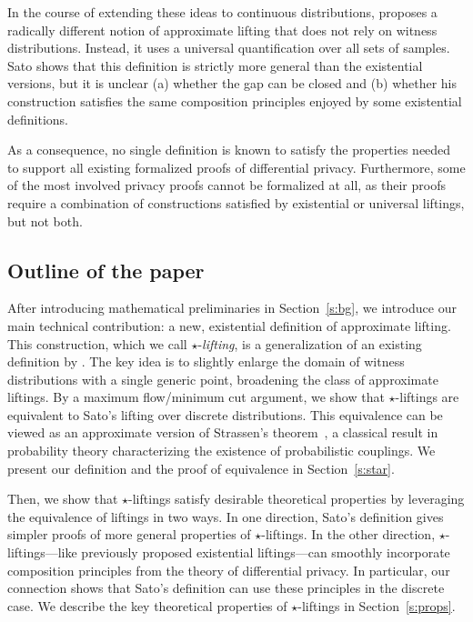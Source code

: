 \documentclass{lmcs}
\begin{document}
In the course of extending these ideas to continuous distributions,
\citet{Sato16} proposes a radically different notion of approximate lifting that
does not rely on witness distributions. Instead, it uses a universal
quantification over all sets of samples. Sato shows that this definition is
strictly more general than the existential versions, but it is unclear (a)
whether the gap can be closed and (b) whether his construction satisfies the
same composition principles enjoyed by some existential definitions.

As a consequence, no single definition is known to satisfy the properties needed
to support all existing formalized proofs of differential privacy. Furthermore,
some of the most involved privacy proofs cannot be formalized at all, as their
proofs require a combination of constructions satisfied by existential or
universal liftings, but not both.

\subsection*{Outline of the paper}

After introducing mathematical preliminaries in Section~\ref{s:bg}, we introduce
our main technical contribution: a new, existential definition of approximate
lifting. This construction, which we call $\star$-\emph{lifting}, is a
generalization of an existing definition by \citet{BartheO13,OlmedoThesis}. The
key idea is to slightly enlarge the domain of witness distributions with a
single generic point, broadening the class of approximate liftings. By a maximum
flow/minimum cut argument, we show that $\star$-liftings are equivalent to
Sato's lifting over discrete distributions. This equivalence can be viewed as an
approximate version of Strassen's theorem~\citep{strassen1965existence}, a
classical result in probability theory characterizing the existence of
probabilistic couplings. We present our definition and the proof of equivalence
in Section~\ref{s:star}.

Then, we show that $\star$-liftings satisfy desirable theoretical properties by
leveraging the equivalence of liftings in two ways. In one direction, Sato's
definition gives simpler proofs of more general properties of $\star$-liftings.
In the other direction, $\star$-liftings---like previously proposed existential
liftings---can smoothly incorporate composition principles from the theory of
differential privacy. In particular, our connection shows that Sato's definition
can use these principles in the discrete case. We describe the key theoretical
properties of $\star$-liftings in Section~\ref{s:props}.
\end{document}
